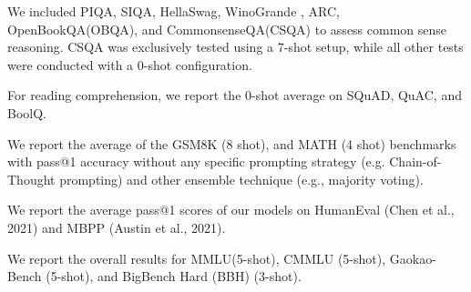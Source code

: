 \documentclass[numbers,sort&compress]{article}
\begin{document}
\begin{description}[leftmargin=0.2in]
    \item[Commonsense Reasoning:] We included PIQA\cite{PIQA}, SIQA\cite{siqa}, HellaSwag\cite{hellaswag}, WinoGrande \cite{winogrande}, ARC\cite{arc}, OpenBookQA(OBQA)\cite{obqa}, and CommonsenseQA(CSQA)\cite{csqa} to assess common sense reasoning. CSQA was exclusively tested using a 7-shot setup, while all other tests were conducted with a 0-shot configuration.
    \item[Reading Comprehension:] For reading comprehension, we report the 0-shot average on SQuAD\cite{squad}, QuAC\cite{quac}, and BoolQ\cite{boolq}.
    \item[Math:] We report the average of the GSM8K\cite{cobbe2021training} (8 shot), and MATH\cite{hendrycks2021measuring} (4 shot) benchmarks with pass@1 accuracy without any specific prompting strategy (e.g. Chain-of-Thought prompting) and other ensemble technique (e.g., majority voting).
    \item[Code:] We report the average pass@1 scores of our models on HumanEval\cite{chen2021evaluating}  (Chen et al., 2021) and MBPP\cite{austin2021program} (Austin et al., 2021). 
    \item[Popular Aggregated Benchmark:] We report the overall results for MMLU\cite{hendrycks2020measuring}(5-shot), CMMLU\cite{li2023cmmlu} (5-shot), Gaokao-Bench\cite{zhang2023evaluating} (5-shot), and BigBench\cite{srivastava2023imitation} Hard (BBH\cite{suzgun2022challenging}) (3-shot).
\end{description}
\end{document}
